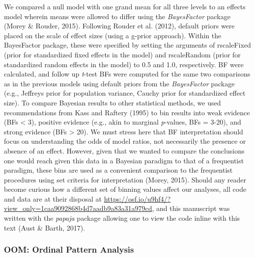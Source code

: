 \documentclass[,man, mask]{apa6}
\theoremstyle{definition}
\theoremstyle{definition}
\theoremstyle{definition}
\theoremstyle{remark}
\begin{document}
We compared a null model with one grand mean for all three levels to an
effects model wherein means were allowed to differ using the
\emph{BayesFactor} package (Morey \& Rouder, 2015). Following Rouder et
al. (2012), default priors were placed on the scale of effect sizes
(using a g-prior approach). Within the BayesFactor package, these were
specified by setting the arguments of rscaleFixed (prior for
standardized fixed effects in the model) and rscaleRandom (prior for
standardized random effects in the model) to 0.5 and 1.0, respectively.
BF were calculated, and follow up \emph{t}-test BFs were computed for
the same two comparisons as in the previous models using default priors
from the \emph{BayesFactor} package (e.g., Jeffreys prior for population
variance, Cauchy prior for standardized effect size). To compare
Bayesian results to other statistical methods, we used recommendations
from Kass and Raftery (1995) to bin results into weak evidence (BFs
\textless{} 3), positive evidence (e.g., akin to marginal
\emph{p}-values, BFs = 3-20), and strong evidence (BFs \textgreater{}
20). We must stress here that BF interpretation should focus on
understanding the odds of model ratios, not necessarily the presence or
absence of an effect. However, given that we wanted to compare the
conclusions one would reach given this data in a Bayesian paradigm to
that of a frequentist paradigm, these bins are used as a convenient
comparison to the frequentist procedures using set criteria for
interpretation (Morey, 2015). Should any reader become curious how a
different set of binning values affect our analyses, all code and data
are at their disposal at
\url{https://osf.io/u9hf4/?view_only=1caa9092868b4d7aadb9a83a31a979cd},
and this manuscript was written with the \emph{papaja} package allowing
one to view the code inline with this text (Aust \& Barth, 2017).

\subsubsection{OOM: Ordinal Pattern
Analysis}\label{oom-ordinal-pattern-analysis}
\end{document}
